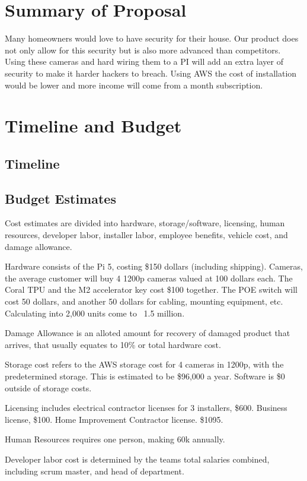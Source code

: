 \documentclass{report}
\begin{document}
\chapter{Summary of Proposal}
Many homeowners would love to have security for their house.
Our product does not only allow for this security but is also more advanced than competitors.
Using these cameras and hard wiring them to a PI will add an extra layer of security to make it harder hackers to breach.
Using AWS the cost of installation would be lower and more income will come from a month subscription.




\chapter{Timeline and Budget}
\section{Timeline}

\section{Budget Estimates}
Cost estimates are divided into hardware, 
storage/software, licensing, human resources,
developer labor, installer labor, employee benefits, 
vehicle cost, and damage allowance.

Hardware consists of the Pi 5, costing \$150 dollars (including shipping). Cameras, 
the average customer will buy 4 1200p cameras valued at 100 dollars each. 
The Coral TPU and the M2 accelerator key cost \$100 together.
The POE switch will cost 50 dollars, and another 50 dollars for cabling, mounting equipment, etc. Calculating into 2,000 units come to ~1.5 million.

Damage Allowance is an alloted amount for recovery of damaged product that arrives, that usually equates to 10\% or total hardware cost.

Storage cost refers to the AWS storage cost for 4 cameras in 1200p, with the predetermined storage. This is estimated to be \$96,000 a year.
Software is \$0 outside of storage costs.

Licensing includes electrical contractor licenses for 3 installers, \$600. Business license, \$100. 
Home Improvement Contractor license. \$1095.

Human Resources requires one person, making 60k annually. 

Developer labor cost is determined by the teams total salaries combined, including scrum master, and head of department.
\end{document}
